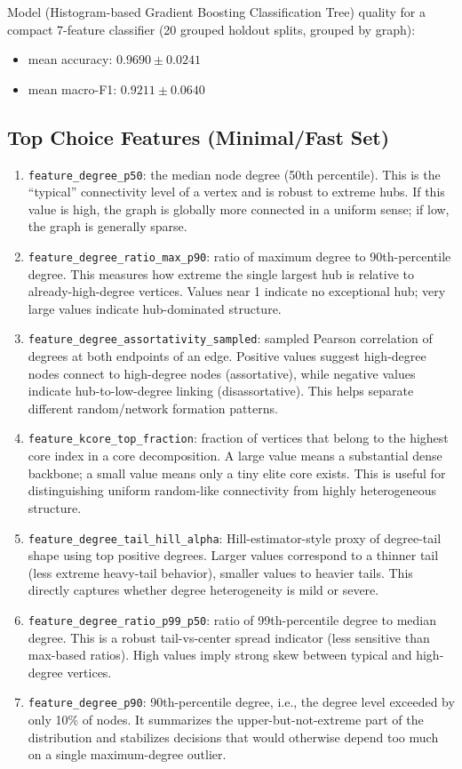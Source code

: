 \documentclass[11pt]{article}
\begin{document}
Model (Histogram-based Gradient Boosting Classification Tree) quality for a compact 7-feature classifier (20 grouped holdout splits, grouped by graph):
\begin{itemize}[leftmargin=*]
    \item mean accuracy: $0.9690 \pm 0.0241$
    \item mean macro-F1: $0.9211 \pm 0.0640$
\end{itemize}

\subsection*{Top Choice Features (Minimal/Fast Set)}
\begin{enumerate}[leftmargin=*]
    \item \texttt{feature\_degree\_p50}: the median node degree (50th percentile). This is the ``typical'' connectivity level of a vertex and is robust to extreme hubs. If this value is high, the graph is globally more connected in a uniform sense; if low, the graph is generally sparse.
    \item \texttt{feature\_degree\_ratio\_max\_p90}: ratio of maximum degree to 90th-percentile degree. This measures how extreme the single largest hub is relative to already-high-degree vertices. Values near 1 indicate no exceptional hub; very large values indicate hub-dominated structure.
    \item \texttt{feature\_degree\_assortativity\_sampled}: sampled Pearson correlation of degrees at both endpoints of an edge. Positive values suggest high-degree nodes connect to high-degree nodes (assortative), while negative values indicate hub-to-low-degree linking (disassortative). This helps separate different random/network formation patterns.
    \item \texttt{feature\_kcore\_top\_fraction}: fraction of vertices that belong to the highest core index in a core decomposition. A large value means a substantial dense backbone; a small value means only a tiny elite core exists. This is useful for distinguishing uniform random-like connectivity from highly heterogeneous structure.
    \item \texttt{feature\_degree\_tail\_hill\_alpha}: Hill-estimator-style proxy of degree-tail shape using top positive degrees. Larger values correspond to a thinner tail (less extreme heavy-tail behavior), smaller values to heavier tails. This directly captures whether degree heterogeneity is mild or severe.
    \item \texttt{feature\_degree\_ratio\_p99\_p50}: ratio of 99th-percentile degree to median degree. This is a robust tail-vs-center spread indicator (less sensitive than max-based ratios). High values imply strong skew between typical and high-degree vertices.
    \item \texttt{feature\_degree\_p90}: 90th-percentile degree, i.e., the degree level exceeded by only 10\% of nodes. It summarizes the upper-but-not-extreme part of the distribution and stabilizes decisions that would otherwise depend too much on a single maximum-degree outlier.
\end{enumerate}
\end{document}

